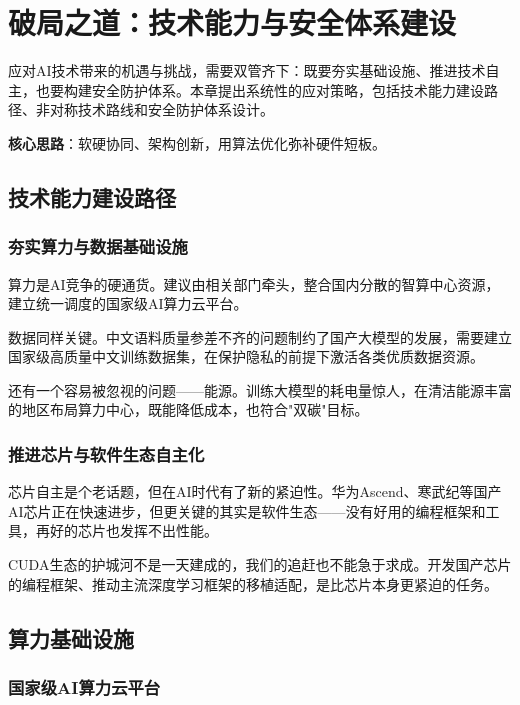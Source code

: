 \chapter{破局之道：技术能力与安全体系建设}

应对AI技术带来的机遇与挑战，需要双管齐下：既要夯实基础设施、推进技术自主，也要构建安全防护体系。本章提出系统性的应对策略，包括技术能力建设路径、非对称技术路线和安全防护体系设计。

\textbf{核心思路}：软硬协同、架构创新，用算法优化弥补硬件短板。

\section{技术能力建设路径}

\subsection{夯实算力与数据基础设施}

算力是AI竞争的硬通货。建议由相关部门牵头，整合国内分散的智算中心资源，建立统一调度的国家级AI算力云平台。

数据同样关键。中文语料质量参差不齐的问题制约了国产大模型的发展，需要建立国家级高质量中文训练数据集，在保护隐私的前提下激活各类优质数据资源。

还有一个容易被忽视的问题——能源。训练大模型的耗电量惊人，在清洁能源丰富的地区布局算力中心，既能降低成本，也符合"双碳"目标。

\subsection{推进芯片与软件生态自主化}

芯片自主是个老话题，但在AI时代有了新的紧迫性。华为Ascend、寒武纪等国产AI芯片正在快速进步，但更关键的其实是软件生态——没有好用的编程框架和工具，再好的芯片也发挥不出性能。

CUDA生态的护城河不是一天建成的，我们的追赶也不能急于求成。开发国产芯片的编程框架、推动主流深度学习框架的移植适配，是比芯片本身更紧迫的任务。

\section{算力基础设施}

\subsection{国家级AI算力云平台}

